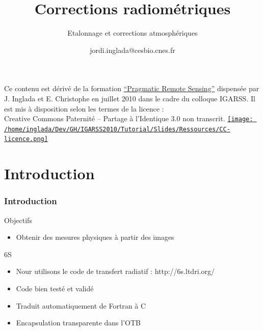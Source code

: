 \documentclass[compress]{beamer}
\title{Corrections radiométriques}
\subtitle{Etalonnage et corrections atmosphériques} %
\author
{jordi.inglada@cesbio.cnes.fr}
\institute[Cesbio] %
{\textsc{Centre d'Études Spatiales de la Biosphère, Toulouse, France}}
\date{}
\begin{document}
\begin{frame}
  \titlepage
  \begin{center}
{\tiny Ce contenu est dérivé de la formation \href{http://www.orfeo-toolbox.org/packages/PragmaticRemoteSensing-handout.pdf}{``Pragmatic Remote
  Sensing''} dispensée par J. Inglada et E. Christophe en juillet 2010
  dans le cadre du colloque IGARSS. Il est mis à disposition selon les termes de la licence :\\
Creative Commons Paternité – Partage à l’Identique 3.0 non transcrit.} \href{http://creativecommons.org/licenses/by-sa/3.0/}{\texttt{[image: /home/inglada/Dev/GH/IGARSS2010/Tutorial/Slides/Ressources/CC-licence.png]}}    
  \end{center}
\end{frame}

\section*{Introduction}

\begin{frame}

  \frametitle{Introduction}
  \begin{block}{Objectifs}
   \begin{itemize}
   \item Obtenir des mesures physiques à partir des images
   \end{itemize}
  \end{block}
  \begin{block}{6S}
   \begin{itemize}
    \item Nour utilisons le code de transfert radiatif : http://6s.ltdri.org/
    \item Code bien testé et validé
    \item Traduit automatiquement de Fortran à C
    \item Encapsulation transparente dans l'OTB
   \end{itemize}
  \end{block}

\end{frame}
\end{document}
